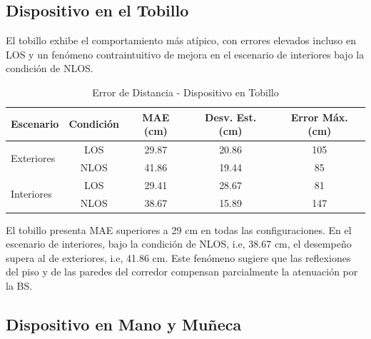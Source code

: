\subsection{Dispositivo en el Tobillo}

El tobillo exhibe el comportamiento más atípico, con errores elevados incluso en LOS y un fenómeno contraintuitivo de mejora en el escenario de interiores bajo la condición de NLOS.
%
\begin{table}[t]
\centering
\caption{Error de Distancia - Dispositivo en Tobillo}
\label{tab:error_tobillo}
\begin{tabular}{lcccc}
\toprule
\rowcolor{headerblue}
\textbf{Escenario} & \textbf{Condición} & \textbf{MAE (cm)} & \textbf{Desv. Est. (cm)} & \textbf{Error Máx. (cm)} \\
\midrule
\multirow{2}{*}{Exteriores}   & LOS & 29.87 & 20.86 & 105 \\
                            & NLOS & 41.86 & 19.44 & 85 \\
\midrule
\multirow{2}{*}{Interiores}   & LOS & 29.41 & 28.67 & 81 \\
                            & NLOS & 38.67 & 15.89 & 147 \\
\bottomrule
\end{tabular}
\end{table}
%
El tobillo presenta MAE superiores a 29 cm en todas las configuraciones. En el escenario de interiores, bajo la condición de NLOS, i.e, 38.67 cm, el desempeño supera al de exteriores, i.e, 41.86 cm. Este fenómeno sugiere que las reflexiones del piso y de las paredes del corredor compensan parcialmente la atenuación por la BS.

\subsection{Dispositivo en Mano y Muñeca}

